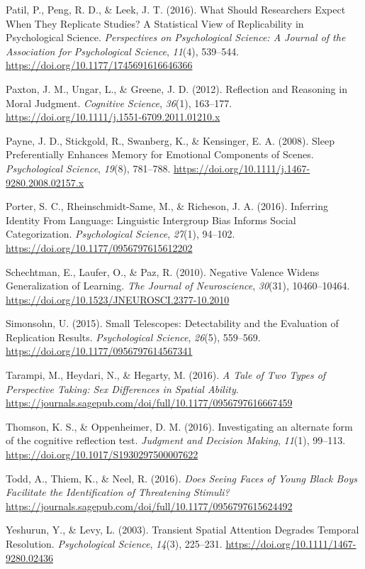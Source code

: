 \documentclass[
  english,
  a4paper,
]{article}
\newlength{\cslhangindent}
\newenvironment{CSLReferences}[2] %
{\begin{list}{}{%
			\setlength{\itemindent}{0pt}
			\setlength{\leftmargin}{0pt}
			\setlength{\parsep}{0pt}
			\ifodd #1
			\setlength{\leftmargin}{\cslhangindent}
			\setlength{\itemindent}{-1\cslhangindent}
			\fi
			\setlength{\itemsep}{#2\baselineskip}}}
	{\end{list}}
\begin{document}
\begin{CSLReferences}{1}{0}
Patil, P., Peng, R. D., \& Leek, J. T. (2016). What {Should Researchers Expect When They Replicate Studies}? {A Statistical View} of {Replicability} in {Psychological Science}. \emph{Perspectives on Psychological Science: A Journal of the Association for Psychological Science}, \emph{11}(4), 539--544. \url{https://doi.org/10.1177/1745691616646366}

Paxton, J. M., Ungar, L., \& Greene, J. D. (2012). Reflection and {Reasoning} in {Moral Judgment}. \emph{Cognitive Science}, \emph{36}(1), 163--177. \url{https://doi.org/10.1111/j.1551-6709.2011.01210.x}

Payne, J. D., Stickgold, R., Swanberg, K., \& Kensinger, E. A. (2008). Sleep {Preferentially Enhances Memory} for {Emotional Components} of {Scenes}. \emph{Psychological Science}, \emph{19}(8), 781--788. \url{https://doi.org/10.1111/j.1467-9280.2008.02157.x}

Porter, S. C., Rheinschmidt-Same, M., \& Richeson, J. A. (2016). Inferring {Identity From Language}: {Linguistic Intergroup Bias Informs Social Categorization}. \emph{Psychological Science}, \emph{27}(1), 94--102. \url{https://doi.org/10.1177/0956797615612202}

Schechtman, E., Laufer, O., \& Paz, R. (2010). Negative {Valence Widens Generalization} of {Learning}. \emph{The Journal of Neuroscience}, \emph{30}(31), 10460--10464. \url{https://doi.org/10.1523/JNEUROSCI.2377-10.2010}

Simonsohn, U. (2015). Small {Telescopes}: {Detectability} and the {Evaluation} of {Replication Results}. \emph{Psychological Science}, \emph{26}(5), 559--569. \url{https://doi.org/10.1177/0956797614567341}

Tarampi, M., Heydari, N., \& Hegarty, M. (2016). \emph{A {Tale} of {Two Types} of {Perspective Taking}: {Sex Differences} in {Spatial Ability}}. \url{https://journals.sagepub.com/doi/full/10.1177/0956797616667459}

Thomson, K. S., \& Oppenheimer, D. M. (2016). Investigating an alternate form of the cognitive reflection test. \emph{Judgment and Decision Making}, \emph{11}(1), 99--113. \url{https://doi.org/10.1017/S1930297500007622}

Todd, A., Thiem, K., \& Neel, R. (2016). \emph{Does {Seeing Faces} of {Young Black Boys Facilitate} the {Identification} of {Threatening Stimuli}?} \url{https://journals.sagepub.com/doi/full/10.1177/0956797615624492}

Yeshurun, Y., \& Levy, L. (2003). Transient {Spatial Attention Degrades Temporal Resolution}. \emph{Psychological Science}, \emph{14}(3), 225--231. \url{https://doi.org/10.1111/1467-9280.02436}

\end{CSLReferences}
\end{document}
